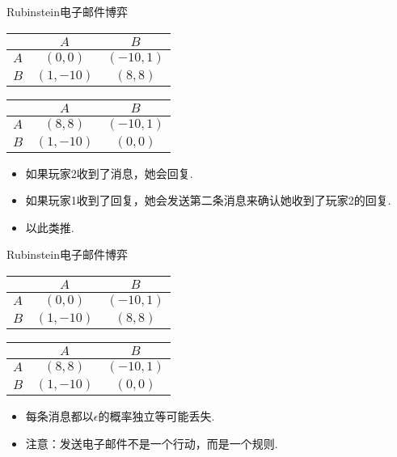 \begin{frame}{Rubinstein电子邮件博弈}
\begin{table}[]
    \centering
\begin{tabular}{c|cc}
&$A$ & $B$ \\
\hline
$A$ & $(0, 0)$ & $(-10, 1)$ \\
$B$ & $(1, -10)$ & $(8, 8)$ \\
\end{tabular}
\qquad
\begin{tabular}{c|cc}
&$A$ & $B$ \\
\hline
$A$ & $(8, 8)$ & $(-10, 1)$ \\
$B$ & $(1, -10)$ & $(0, 0)$ \\
\end{tabular}
\end{table}
\begin{itemize}
\item 如果玩家2收到了消息，她会回复.  
\item 如果玩家1收到了回复，她会发送第二条消息来确认她收到了玩家2的回复.  
\item 以此类推.  
\end{itemize}
\end{frame}

\begin{frame}{Rubinstein电子邮件博弈}
\begin{table}[]
    \centering
\begin{tabular}{c|cc}
&$A$ & $B$ \\
\hline
$A$ & $(0, 0)$ & $(-10, 1)$ \\
$B$ & $(1, -10)$ & $(8, 8)$ \\
\end{tabular}
\qquad
\begin{tabular}{c|cc}
&$A$ & $B$ \\
\hline
$A$ & $(8, 8)$ & $(-10, 1)$ \\
$B$ & $(1, -10)$ & $(0, 0)$ \\
\end{tabular}
\end{table}
\begin{itemize}
\item 每条消息都以$\epsilon$的概率独立等可能丢失.  
\item 注意：发送电子邮件不是一个行动，而是一个规则.  
\end{itemize}
\end{frame}

